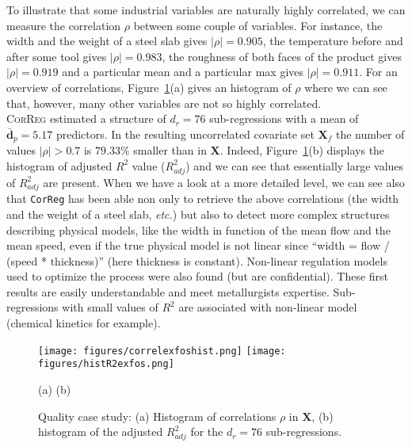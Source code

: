 \documentclass[12pt,a4paper]{report}
\begin{document}

To illustrate that some industrial variables are naturally highly correlated, we can measure the correlation $\rho$ between some couple of variables. For instance, the width and the weight of a steel slab gives $|\rho|=0.905$, the temperature before and after some tool gives $|\rho|=0.983$, the  roughness of both faces of the product gives $|\rho|= 0.919$ and a particular mean and a particular max gives $|\rho|=0.911$. For an overview of correlations, Figure~\ref{fig:graphCorr.quality}(a) gives an histogram of $\rho$ where we can see that, however, many other variables are not so highly correlated.\\

\textsc{CorReg} estimated a structure of $d_r=76$ sub-regressions with a mean of $\bar{\boldsymbol{d}}_p=5.17$ predictors. In the resulting uncorrelated covariate set $\boldsymbol{X}_f$ the number of values $|\rho|>0.7$ is $79.33\%$ smaller than in $\boldsymbol{X}$. Indeed, Figure~\ref{fig:graphCorr.quality}(b) displays the histogram of adjusted $R^2$ value ($R^2_{adj}$) and we can see that essentially large values of $R^2_{adj}$ are present. When we have a look at a more detailed level, we can see also that {\tt CorReg} has been able non only to retrieve the above correlations (the width and the weight of a steel slab, {\it etc.}) but also to detect more complex structures describing physical models, like the width in function of the mean flow and the mean speed, even if the true physical model is not linear since ``width = flow / (speed * thickness)'' (here thickness is constant). Non-linear regulation models used to optimize the process were also found (but are confidential). These first results are easily understandable and meet metallurgists expertise.  Sub-regressions with small values of $R^2$ are associated with non-linear model (chemical kinetics for example).
		
\begin{figure}[h!]
\begin{center}
			\texttt{[image: figures/correlexfoshist.png]}
			\texttt{[image: figures/histR2exfos.png]}
\end{center}
\vspace{-5mm}
			\centerline{(a) \hspace{180px} (b)}
			\caption{Quality case study: (a) Histogram of correlations $\rho$ in $\boldsymbol{X}$, (b) histogram of the adjusted $R^2_{adj}$ for the $d_r=76$ sub-regressions.}\label{fig:graphCorr.quality}
\end{figure}  			
		
\end{document}
